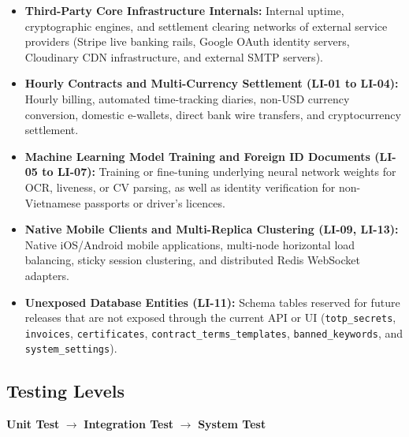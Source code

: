 \documentclass[12pt,a4paper]{article}
\begin{document}
\begin{itemize}
  \item \textbf{Third-Party Core Infrastructure Internals:} Internal uptime, cryptographic engines, and settlement clearing networks of external service providers (Stripe live banking rails, Google OAuth identity servers, Cloudinary CDN infrastructure, and external SMTP servers).
  \item \textbf{Hourly Contracts and Multi-Currency Settlement (LI-01 to LI-04):} Hourly billing, automated time-tracking diaries, non-USD currency conversion, domestic e-wallets, direct bank wire transfers, and cryptocurrency settlement.
  \item \textbf{Machine Learning Model Training and Foreign ID Documents (LI-05 to LI-07):} Training or fine-tuning underlying neural network weights for OCR, liveness, or CV parsing, as well as identity verification for non-Vietnamese passports or driver's licences.
  \item \textbf{Native Mobile Clients and Multi-Replica Clustering (LI-09, LI-13):} Native iOS/Android mobile applications, multi-node horizontal load balancing, sticky session clustering, and distributed Redis WebSocket adapters.
  \item \textbf{Unexposed Database Entities (LI-11):} Schema tables reserved for future releases that are not exposed through the current API or UI (\texttt{totp\_secrets}, \texttt{invoices}, \texttt{certificates}, \texttt{contract\_terms\_templates}, \texttt{banned\_keywords}, and \texttt{system\_settings}).
\end{itemize}

\subsection{Testing Levels}

\begin{center}
\textbf{Unit Test} $\rightarrow$ \textbf{Integration Test} $\rightarrow$ \textbf{System Test}
\end{center}
\end{document}
